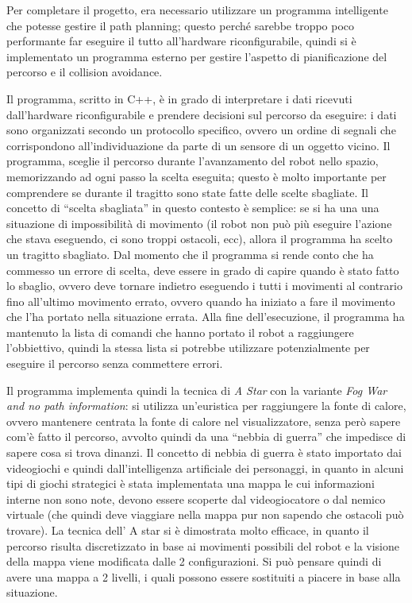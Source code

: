 \documentclass[a4paper,titlepage]{book}
\begin{document}
Per completare il progetto, era necessario utilizzare un programma intelligente che potesse gestire il path planning; questo perché sarebbe troppo poco performante far eseguire il tutto all'hardware riconfigurabile, quindi si è implementato un programma esterno per gestire l'aspetto di pianificazione del percorso e il collision avoidance.

Il programma, scritto in C++, è in grado di interpretare i dati ricevuti dall'hardware riconfigurabile e prendere decisioni sul percorso da eseguire: i dati sono organizzati secondo un protocollo specifico, ovvero un ordine di segnali che corrispondono all'individuazione da parte di un sensore di un oggetto vicino. Il programma, sceglie il percorso durante l'avanzamento del robot nello spazio, memorizzando ad ogni passo la scelta eseguita; questo è molto importante per comprendere se durante il tragitto sono state fatte delle scelte sbagliate.
Il concetto di ``scelta sbagliata'' in questo contesto è semplice: se si ha una una situazione di impossibilità di movimento (il robot non può più eseguire l'azione che stava eseguendo, ci sono troppi ostacoli, ecc), allora il programma ha scelto un tragitto sbagliato. Dal momento che il programma si rende conto che ha commesso un errore di scelta, deve essere in grado di capire quando è stato fatto lo sbaglio, ovvero deve tornare indietro eseguendo i tutti i movimenti al contrario fino all'ultimo movimento errato,
ovvero quando ha iniziato a fare il movimento che l'ha portato nella situazione errata. Alla fine dell'esecuzione, il programma ha mantenuto la lista di comandi che hanno portato il robot a raggiungere l'obbiettivo, quindi la stessa lista si potrebbe utilizzare potenzialmente per eseguire il percorso senza commettere errori.

Il programma implementa quindi la tecnica di \textit{A Star} con la variante \textit{Fog War and no path information}: si utilizza un'euristica per raggiungere la fonte di calore, ovvero mantenere centrata la fonte di calore nel visualizzatore, senza però sapere com'è fatto il percorso, avvolto quindi da una ``nebbia di guerra'' che impedisce di sapere cosa si trova dinanzi. Il concetto di nebbia di guerra è stato importato dai videogiochi e quindi dall'intelligenza artificiale dei personaggi,
in quanto in alcuni tipi di giochi strategici è stata implementata una mappa le cui informazioni interne non sono note, devono essere scoperte dal videogiocatore o dal nemico virtuale (che quindi deve viaggiare nella mappa pur non sapendo che ostacoli può trovare).
La tecnica dell' A star si è dimostrata molto efficace, in quanto il percorso risulta discretizzato in base ai movimenti possibili del robot e la visione della mappa viene modificata dalle 2 configurazioni. Si può pensare quindi di avere una mappa a 2 livelli, i quali possono essere sostituiti a piacere in base alla situazione.
\end{document}
